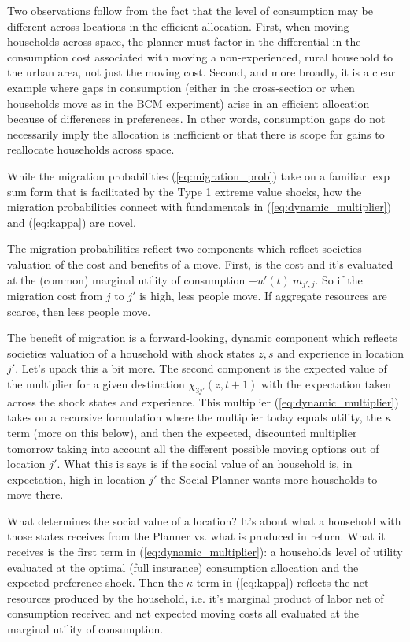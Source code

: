 \documentclass[12pt,pdftex]{article}
\begin{document}
\begin{onehalfspacing}
Two observations follow from the fact that the level of consumption may be different across locations in the efficient allocation. First, when moving households across space, the planner must factor in the differential in the consumption cost associated with moving a non-experienced, rural household to the urban area, not just the moving cost. Second, and more broadly, it is a clear example where gaps in consumption (either in the cross-section or when households move as in the BCM experiment) arise in an efficient allocation because of differences in preferences. In other words, consumption gaps do not necessarily imply the allocation is inefficient or that there is scope for gains to reallocate households across space.

While the migration probabilities (\ref{eq:migration_prob}) take on a familiar $\exp$ sum form that is facilitated by the Type 1 extreme value shocks, how the migration probabilities connect with fundamentals in (\ref{eq:dynamic_multiplier}) and (\ref{eq:kappa}) are novel. 

The migration probabilities reflect two components which reflect societies valuation of the cost and benefits of a move. First, is the cost and it's evaluated at the (common) marginal utility of consumption $-u'(t) \ m_{j',j}$. So if the migration cost from $j$ to $j'$ is high, less people move. If aggregate resources are scarce, then less people move. 

The benefit of migration is a forward-looking, dynamic component which reflects societies valuation of a household with shock states $z,s$ and experience in location $j'$. Let's upack this a bit more. The second component is the expected value of the multiplier for a given destination $\chi_{3j'}(z, t+1)$ with the expectation taken across the shock states and experience. This multiplier (\ref{eq:dynamic_multiplier}) takes on a recursive formulation where the multiplier today equals utility, the $\kappa$ term (more on this below), and then the expected, discounted multiplier tomorrow taking into account all the different possible moving options out of location $j'$. What this is says is if the social value of an household is, in expectation, high in location $j'$ the Social Planner wants more households to move there.

What determines the social value of a location? It's about what a household with those states receives from the Planner vs. what is produced in return. What it receives is the first term in (\ref{eq:dynamic_multiplier}): a households level of utility evaluated at the optimal (full insurance) consumption allocation and the expected preference shock. Then the $\kappa$ term in (\ref{eq:kappa}) reflects the net resources produced by the household, i.e. it's marginal product of labor net of consumption received and net expected moving costs|all evaluated at the marginal utility of consumption. 


\end{onehalfspacing}
\end{document}
